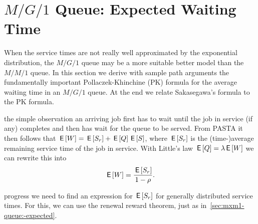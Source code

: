 




\section{$M/G/1$ Queue: Expected Waiting Time}
\label{sec:mg1}


When the service times are not really well approximated by the exponential distribution, the $M/G/1$ queue may be a more suitable better model than the $M/M/1$ queue.
In this section we derive with sample path arguments the fundamentally important Pollaczek-Khinchine (PK) formula for the average waiting time in an $M/G/1$ queue.
At the end we relate Sakasegawa's formula to the PK formula.


 the simple observation an arriving job first has to wait until the job in service (if any) completes and then has wait for the queue to be served.
From PASTA it then follows  that
$\,\mathsf{E}\left[W\right] = \,\mathsf{E}\left[S_r\right] + \,\mathsf{E}\left[Q\right] \,\mathsf{E}\left[S\right]$, where  $\,\mathsf{E}\left[S_r\right]$ is the (time-)average remaining service time of the job in service.
With Little's law $\,\mathsf{E}\left[Q\right] = \lambda \,\mathsf{E}\left[W\right]$ we can rewrite this into
\begin{equation*}
 \,\mathsf{E}\left[W\right] = \frac{\,\mathsf{E}\left[S_r\right]}{1-\rho}.
\end{equation*}

 progress we need to find an expression for $\,\mathsf{E}\left[S_r\right]$ for generally distributed service times.
For this, we can use the renewal reward theorem, just as in~\cref{sec:mxm1-queue:-expected}.

